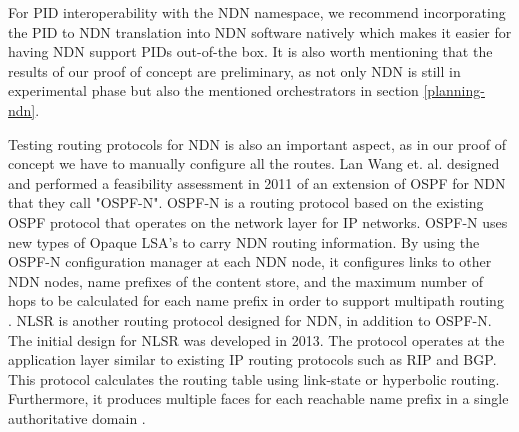 
For PID interoperability with the NDN namespace, we recommend incorporating the PID to NDN translation into NDN software natively which makes it easier for having NDN support PIDs out-of-the box. It is also worth mentioning that the results of our proof of concept are preliminary, as not only NDN is still in experimental phase but also the mentioned orchestrators in section \ref{planning-ndn}.
 
Testing routing protocols for NDN is also an important aspect, as in our proof of concept we have to manually configure all the routes. Lan Wang et. al. \cite{ndn-ospfn1} designed and performed a feasibility assessment in 2011 of an extension of OSPF for NDN that they call "OSPF-N". OSPF-N is a routing protocol based on the existing OSPF protocol that operates on the network layer for IP networks. OSPF-N uses new types of Opaque LSA's to carry NDN routing information. By using the OSPF-N configuration manager at each NDN node, it configures links to other NDN nodes, name prefixes of the content store, and the maximum number of hops to be calculated for each name prefix in order to support multipath routing \cite{ndn-ospfn2}. 
NLSR is another routing protocol designed for NDN, in addition to OSPF-N. 
The initial design for NLSR was developed in 2013. The protocol operates at the application layer similar to existing IP routing protocols such as RIP and BGP. This protocol calculates the routing table using link-state or hyperbolic routing. Furthermore, it produces multiple faces for each reachable name prefix in a single authoritative domain \cite{nlsr}. 





